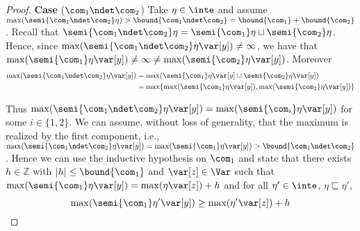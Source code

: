 \begin{proof}
    
  
  
  \medskip
  
  \noindent
  \textbf{Case} (\(\com_1 \ndet \com_2\))
  Take \(\eta \in \inte\) and assume
  \(\max(\semi{\com_1 \ndet \com_2}\eta) > \bound{\com_1 \ndet \com_2}
  = \bound{\com_1} + \bound{\com_2}\).  Recall that
  \(\semi{\com_1 \ndet \com_2} \eta = \semi{\com_1}\eta \sqcup
  \semi{\com_2}\eta\).
  Hence, since
  \(\max(\semi{\com_1 \ndet \com_2} \eta \var[y]) \neq \infty\), we
  have that
  \(\max(\semi{\com_1} \eta \var[y]) \neq \infty \neq
  \max(\semi{\com_2}\eta \var[y])\).  Moreover
  \begin{align*}
    \max(\semi{\com_1 \ndet \com_2}\eta \var[y])& =  \max(\semi{\com_1}\eta \var[y] \sqcup \semi{\com_2}\eta \var[y]) \\ 
    & = \max \{ \max(\semi{\com_1}\eta \var[y]), \max(\semi{\com_2}\eta \var[y])\} %
  \end{align*}

  Thus
  \(\max(\semi{\com_1 \ndet \com_2}\eta \var[y]) =
  \max(\semi{\com_i}\eta \var[y])\) for some \(i \in \{1,2\}\). We can
  assume, without loss of generality, that the maximum is realized by
  the first component, i.e.,
  \(\max(\semi{\com_1 \ndet \com_2}\eta \var[y]) =
  \max(\semi{\com_1}\eta \var[y]) > \bound{\com_1 \ndet
    \com_2}\). Hence we can use the inductive hypothesis on \(\com_1\)
  and state that there exists \(h \in \mathbb{Z}\) with
  \(|h| \leq \bound{\com_1}\) and \(\var[z] \in \Var\) such that
  \(\max(\semi{\com_1}\eta \var[y]) = \max(\eta \var[z]) + h\) and for
  all \(\eta' \in \inte\), \(\eta \sqsubseteq \eta'\),
  \[
  \max(\semi{\com_1}\eta' \var[y]) \geq \max(\eta' \var[z]) + h
  \]


\end{proof}
